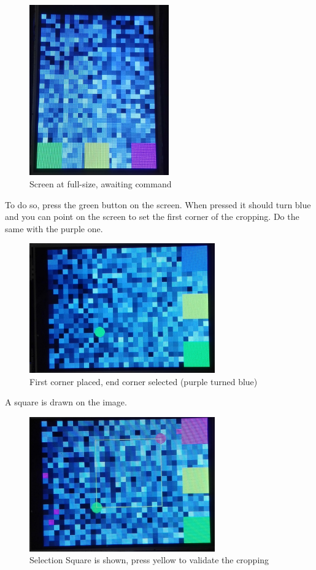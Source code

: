 \documentclass[a4paper]{article}
\begin{document}
\begin{figure}[h!]
    \centering
    \includegraphics[width = 6cm]{images/screenFull.jpg}
    \caption{Screen at full-size, awaiting command}
    \label{fig:not cropped}
\end{figure}

To do so, press the green button on the screen. When pressed it should turn blue and you can point on the screen to set the first corner of the cropping. Do the same with the purple one.


\begin{figure}[h!]
    \centering
    \includegraphics[width = 8cm]{images/screenSelected.jpg}
    \caption{First corner placed, end corner selected (purple turned blue)}
    \label{fig:selected}
\end{figure}

A square is drawn on the image.

\begin{figure}[h!]
    \centering
    \includegraphics[width = 8cm]{images/screenSquare.jpg}
    \caption{Selection Square is shown, press yellow to validate the cropping}
    \label{fig:screenSquare}
\end{figure}
\end{document}
